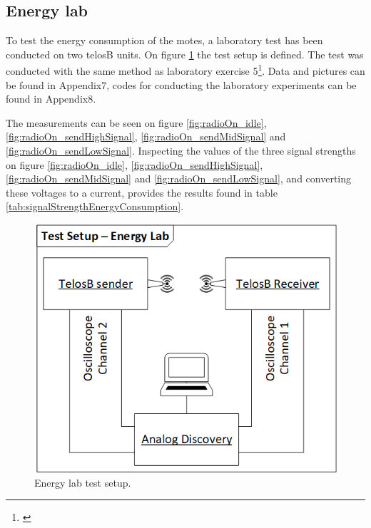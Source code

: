 \subsection{Energy lab}\label{sc:energylab}

To test the energy consumption of the motes, a laboratory test has been conducted on two telosB units. On figure \ref{fig:energyLab_testSetup} the test setup is defined. The test was conducted with the same method as laboratory exercise 5\footnote{\cite{Madsen}}. Data and pictures can be found in Appendix7, codes for conducting the laboratory experiments can be found in Appendix8.

\noindent The measurements can be seen on figure \ref{fig:radioOn_idle}, \ref{fig:radioOn_sendHighSignal}, \ref{fig:radioOn_sendMidSignal} and \ref{fig:radioOn_sendLowSignal}. Inspecting the values of the three signal strengths on figure \ref{fig:radioOn_idle}, \ref{fig:radioOn_sendHighSignal}, \ref{fig:radioOn_sendMidSignal} and \ref{fig:radioOn_sendLowSignal}, and converting these voltages to a current, provides the results found in table \ref{tab:signalStrengthEnergyConsumption}.

\begin{figure}[h]
	\centering
	\includegraphics[width=1\linewidth]{implementation/energylab/fig/energyLab_testSetup.png}
	\caption{Energy lab test setup.}
	\label{fig:energyLab_testSetup}
\end{figure}

